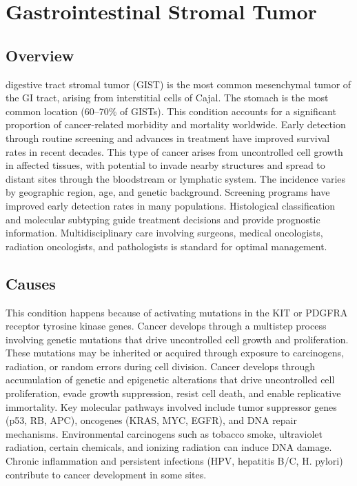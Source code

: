 \chapter{Gastrointestinal Stromal Tumor}
\label{sec:Gastrointestinal Stromal Tumor}

\section{Overview}
digestive tract stromal tumor (GIST) is the most common mesenchymal tumor of the GI tract, arising from interstitial cells of Cajal. The stomach is the most common location (60--70\% of GISTs). This condition accounts for a significant proportion of cancer-related morbidity and mortality worldwide. Early detection through routine screening and advances in treatment have improved survival rates in recent decades. This type of cancer arises from uncontrolled cell growth in affected tissues, with potential to invade nearby structures and spread to distant sites through the bloodstream or lymphatic system. The incidence varies by geographic region, age, and genetic background. Screening programs have improved early detection rates in many populations. Histological classification and molecular subtyping guide treatment decisions and provide prognostic information. Multidisciplinary care involving surgeons, medical oncologists, radiation oncologists, and pathologists is standard for optimal management.
\section{Causes}
This condition happens because of activating mutations in the KIT or PDGFRA receptor tyrosine kinase genes. Cancer develops through a multistep process involving genetic mutations that drive uncontrolled cell growth and proliferation. These mutations may be inherited or acquired through exposure to carcinogens, radiation, or random errors during cell division.     Cancer develops through accumulation of genetic and epigenetic alterations that drive uncontrolled cell proliferation, evade growth suppression, resist cell death, and enable replicative immortality. Key molecular pathways involved include tumor suppressor genes (p53, RB, APC), oncogenes (KRAS, MYC, EGFR), and DNA repair mechanisms. Environmental carcinogens such as tobacco smoke, ultraviolet radiation, certain chemicals, and ionizing radiation can induce DNA damage. Chronic inflammation and persistent infections (HPV, hepatitis B/C, H. pylori) contribute to cancer development in some sites.
